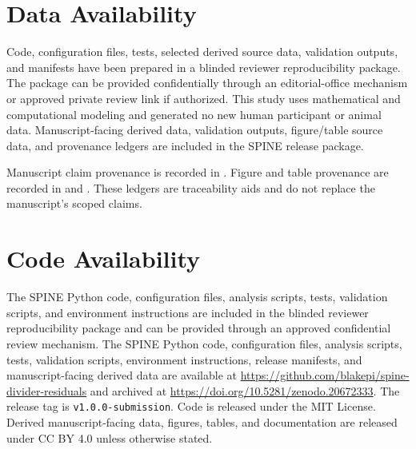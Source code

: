 \section*{Data Availability}

\ifblind
Code, configuration files, tests, selected derived source data, validation outputs, and manifests have been prepared in a blinded reviewer reproducibility package. The package can be provided confidentially through an editorial-office mechanism or approved private review link if authorized.
\else
This study uses mathematical and computational modeling and generated no new human participant or animal data. Manuscript-facing derived data, validation outputs, figure/table source data, and provenance ledgers are included in the SPINE release package. \spinerepository
\fi

Manuscript claim provenance is recorded in . Figure and table provenance are recorded in  and . These ledgers are traceability aids and do not replace the manuscript's scoped claims.

\section*{Code Availability}

\ifblind
The SPINE Python code, configuration files, analysis scripts, tests, validation scripts, and environment instructions are included in the blinded reviewer reproducibility package and can be provided through an approved confidential review mechanism.
\else
The SPINE Python code, configuration files, analysis scripts, tests, validation scripts, environment instructions, release manifests, and manuscript-facing derived data are available at \url{https://github.com/blakepi/spine-divider-residuals} and archived at \url{https://doi.org/10.5281/zenodo.20672333}. The release tag is \texttt{v1.0.0-submission}. Code is released under the MIT License. Derived manuscript-facing data, figures, tables, and documentation are released under CC BY 4.0 unless otherwise stated.
\fi
